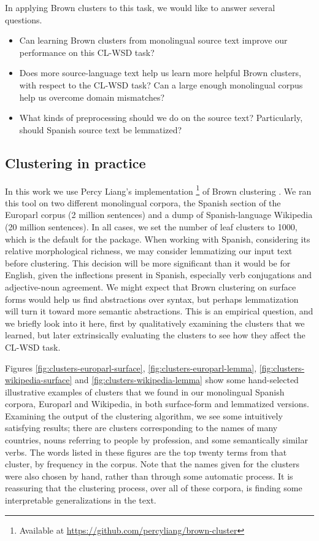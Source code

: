 In applying Brown clusters to this task, we would like to answer several
questions.

\begin{itemize}
  \item Can learning Brown clusters from monolingual source text improve our
  performance on this CL-WSD task?
  \item Does more source-language text help us learn more helpful Brown
  clusters, with respect to the CL-WSD task? Can a large enough monolingual
  corpus help us overcome domain mismatches?
  \item What kinds of preprocessing should we do on the source text?
  Particularly, should Spanish source text be lemmatized?
\end{itemize}

\subsection{Clustering in practice}
In this work we use Percy Liang's implementation \footnote{Available at
\url{https://github.com/percyliang/brown-cluster}} of Brown clustering
\cite{Liang05semi-supervisedlearning}. We ran this tool on two different
monolingual corpora, the Spanish section of the Europarl corpus \cite{europarl}
(2 million sentences) and a dump of Spanish-language Wikipedia (20 million
sentences). In all cases, we set the number of leaf clusters to 1000, which is
the default for the package.
When working with Spanish, considering its relative morphological richness, we
may consider lemmatizing our input text before clustering. This decision will
be more significant than it would be for English, given the inflections present
in Spanish, especially verb conjugations and adjective-noun agreement.
We might expect that Brown clustering on surface forms would help us find
abstractions over syntax, but perhaps lemmatization will turn it toward more
semantic abstractions. This is an empirical question, and we briefly look into
it here, first by qualitatively examining the clusters that we learned, but
later extrinsically evaluating the clusters to see how they affect the CL-WSD
task.



Figures \ref{fig:clusters-europarl-surface}, \ref{fig:clusters-europarl-lemma},
\ref{fig:clusters-wikipedia-surface} and \ref{fig:clusters-wikipedia-lemma}
show some hand-selected illustrative examples of clusters that we found in our
monolingual Spanish corpora, Europarl and Wikipedia, in both surface-form and
lemmatized versions. Examining the output of the clustering algorithm, we see
some intuitively satisfying results; there are clusters corresponding to the
names of many countries, nouns referring to people by profession, and some
semantically similar verbs. The words listed in these figures are the top
twenty terms from that cluster, by frequency in the corpus. Note that the names
given for the clusters were also chosen by hand, rather than through some
automatic process. It is reassuring that the clustering process, over all of
these corpora, is finding some interpretable generalizations in the text.

